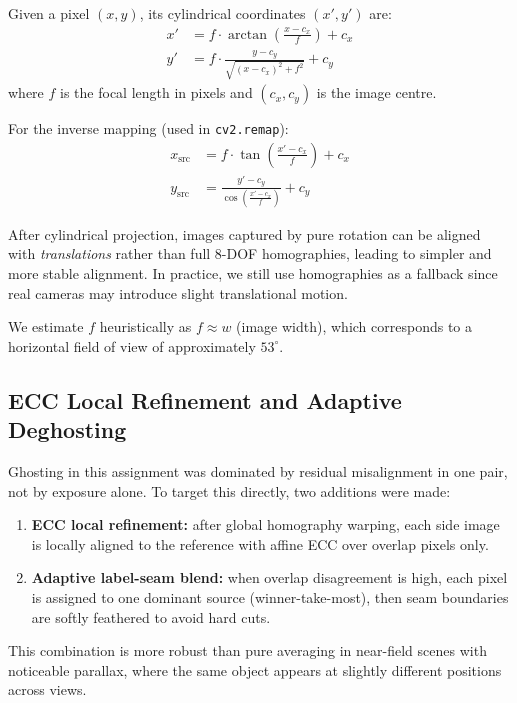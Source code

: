 \documentclass[conference]{IEEEtran}
\begin{document}
Given a pixel $(x, y)$, its cylindrical coordinates $(x', y')$ are:
\begin{align}
  x' &= f \cdot \arctan\!\left(\frac{x - c_x}{f}\right) + c_x
  \label{eq:cyl_x} \\
  y' &= f \cdot \frac{y - c_y}{\sqrt{(x - c_x)^2 + f^2}} + c_y
  \label{eq:cyl_y}
\end{align}
where $f$ is the focal length in pixels and $(c_x, c_y)$ is the image centre.

For the inverse mapping (used in \texttt{cv2.remap}):
\begin{align}
  x_{\text{src}} &= f \cdot \tan\!\left(\frac{x' - c_x}{f}\right) + c_x \\
  y_{\text{src}} &= \frac{y' - c_y}{\cos\!\left(\frac{x' - c_x}{f}\right)} + c_y
\end{align}

After cylindrical projection, images captured by pure rotation can be aligned
with \emph{translations} rather than full 8-DOF homographies, leading to
simpler and more stable alignment. In practice, we still use homographies as a
fallback since real cameras may introduce slight translational motion.

We estimate $f$ heuristically as $f \approx w$ (image width), which
corresponds to a horizontal field of view of approximately $53^{\circ}$.


\subsection{ECC Local Refinement and Adaptive Deghosting}

Ghosting in this assignment was dominated by residual misalignment in one
pair, not by exposure alone. To target this directly, two additions were made:
\begin{enumerate}
  \item \textbf{ECC local refinement:} after global homography warping, each
        side image is locally aligned to the reference with affine ECC over
        overlap pixels only.
  \item \textbf{Adaptive label-seam blend:} when overlap disagreement is high,
        each pixel is assigned to one dominant source (winner-take-most), then
        seam boundaries are softly feathered to avoid hard cuts.
\end{enumerate}

This combination is more robust than pure averaging in near-field scenes with
noticeable parallax, where the same object appears at slightly different
positions across views.
\end{document}
